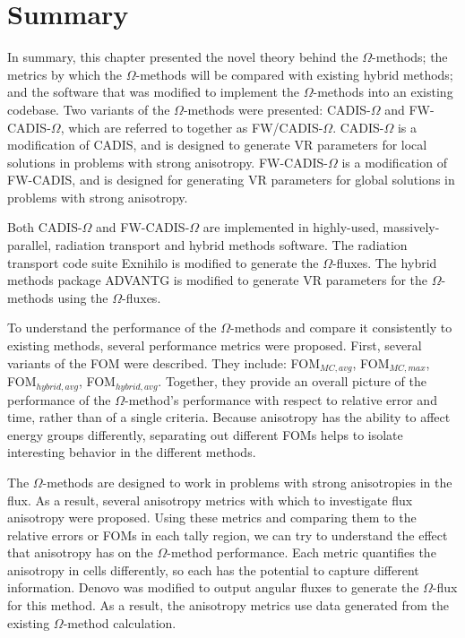 \section*{Summary}

In summary, this chapter presented the novel theory behind the $\Omega$-methods;
the metrics by which the $\Omega$-methods will be compared with existing hybrid
methods; and the software that was modified to implement the $\Omega$-methods
into an existing codebase. Two variants of the $\Omega$-methods were presented:
CADIS-$\Omega$ and FW-CADIS-$\Omega$, which are referred to together as
FW/CADIS-$\Omega$. CADIS-$\Omega$ is a modification of CADIS, and is designed to
generate VR parameters for local solutions in problems with strong anisotropy.
FW-CADIS-$\Omega$ is a modification of FW-CADIS, and is designed for generating
VR parameters for global solutions in problems with strong anisotropy.

Both CADIS-$\Omega$ and FW-CADIS-$\Omega$ are implemented in highly-used,
massively-parallel, radiation transport and hybrid methods software. The
radiation transport code suite Exnihilo is modified to generate the
$\Omega$-fluxes. The hybrid methods package ADVANTG is modified to generate
VR parameters for the $\Omega$-methods using the $\Omega$-fluxes.

To understand the performance of the $\Omega$-methods and compare it
consistently to existing methods, several performance metrics were proposed. First,
several variants of the FOM were described. They include: FOM$_{MC,avg}$,
FOM$_{MC,max}$, FOM$_{hybrid,avg}$, FOM$_{hybrid,avg}$. Together, they provide
an overall picture of the performance of the $\Omega$-method's performance with
respect to relative error and time, rather than of a
single criteria. Because anisotropy has the ability to affect energy groups
differently, separating out different FOMs helps to isolate interesting behavior
in the different methods.

The $\Omega$-methods are designed to work in problems with strong
anisotropies in the flux. As a result, several anisotropy metrics
with which to investigate flux anisotropy were proposed.
Using these metrics and comparing them to
the relative errors or FOMs in each
tally region, we can try to understand the effect that anisotropy has on the
$\Omega$-method performance. Each metric quantifies the anisotropy in cells
differently, so each has the potential to capture different information. Denovo
was modified to output angular fluxes to generate the $\Omega$-flux for this
method. As a result, the anisotropy metrics use data generated from the existing
$\Omega$-method calculation.


